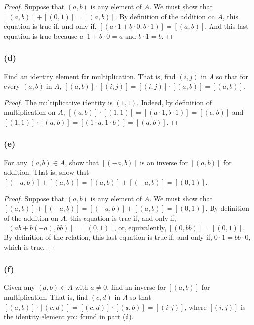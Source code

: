 \documentclass[14pt]{extarticle}
\begin{document}
\begin{proof}
        Suppose that \((a, b)\) is any element of \(A\). We must show that \([(a, b)] + [(0, 1)] = [(a, b)]\). By definition
        of the addition on \(A\), this equation is true if, and only if, \([(a \cdot 1 + b \cdot 0, b \cdot 1)]=[(a, b)]\).
        And this last equation is true because \(a \cdot 1 + b \cdot 0 = a\) and \(b \cdot 1 = b\).
\end{proof}

\subsubsection{(d)}
Find an identity element for multiplication. That is, find \((i, j)\) in \(A\) so that for every \((a, b)\) in \(A\),
\([(a, b)] \cdot [(i, j)] = [(i, j)] \cdot [(a, b)] = [(a, b)]\).

\begin{proof}
        The multiplicative identity is \((1,1)\). Indeed, by definition of multiplication on \(A\), \([(a, b)] \cdot
        [(1, 1)] = [(a \cdot 1, b \cdot 1)] = [(a,b)]\) and \([(1, 1)] \cdot [(a, b)] = [(1 \cdot a, 1 \cdot b)] = [(a,b)]\).
\end{proof}

\subsubsection{(e)}
For any \((a, b) \in A\), show that \([(-a, b)]\) is an inverse for \([(a, b)]\) for addition. That is, show that
\([(-a, b)] + [(a, b)] = [(a, b)] + [(-a, b)] = [(0, 1)]\).

\begin{proof}
        Suppose that \((a, b)\) is any element of \(A\). We must show that \([(a, b)] + [(-a, b)] = [(-a, b)] + [(a, b)] =
        [(0, 1)]\). By definition of the addition on \(A\), this equation is true if, and only if, \([(ab + b(-a), bb)] =
        [(0, 1)]\), or, equivalently, \([(0, bb)] = [(0, 1)]\). By definition of the relation, this last equation is true if,
        and only if, \(0 \cdot 1 = bb \cdot 0\), which is true.
\end{proof}

\subsubsection{(f)}
Given any \((a, b) \in A\) with \(a \neq 0\), find an inverse for \([(a, b)]\) for multiplication. That is, find
\((c, d)\) in \(A\) so that \([(a, b)] \cdot [(c, d)] = [(c, d)] \cdot [(a, b)] = [(i, j)]\), where \([(i, j)]\) is
the identity element you found in part (d).
\end{document}
